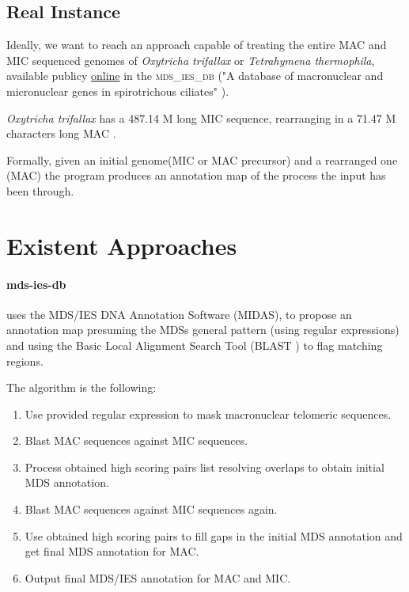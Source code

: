\subsection{Real Instance}

Ideally, we want to reach an approach capable of treating the entire MAC and MIC sequenced genomes of \textit{Oxytricha trifallax} or \textit{Tetrahymena thermophila}, available publicy \href{http://oxytricha.princeton.edu/mds_ies_db/}{online} in the \textsc{mds\_ies\_db} ("A database of macronuclear and micronuclear genes in spirotrichous ciliates" \cite{mdsiesdb}).

\textit{Oxytricha trifallax} has a 487.14 M long MIC sequence, rearranging in a 71.47 M characters long MAC \cite{mdsiesdb}.

Formally, given an initial genome(MIC or MAC precursor) and a rearranged one (MAC) the program produces an annotation map of the process the input has been through.

\section{Existent Approaches}

\paragraph{mds-ies-db}\cite{mdsiesdb} uses the MDS/IES DNA Annotation Software (MIDAS), \cite{midas} to propose an annotation map presuming the MDSs general pattern (using regular expressions) and using the Basic Local Alignment Search Tool (BLAST \cite{boratyn2013blast}) to flag matching regions.

The algorithm is the following:

\begin{enumerate}
  \item Use provided regular expression to mask macronuclear telomeric sequences.
  \item Blast MAC sequences against MIC sequences.
  \item Process obtained high scoring pairs list resolving overlaps to obtain initial MDS annotation.
  \item Blast MAC sequences against MIC sequences again.
  \item Use obtained high scoring pairs to fill gaps in the initial MDS annotation and get final MDS annotation for MAC.
  \item Output final MDS/IES annotation for MAC and MIC.
\end{enumerate}

